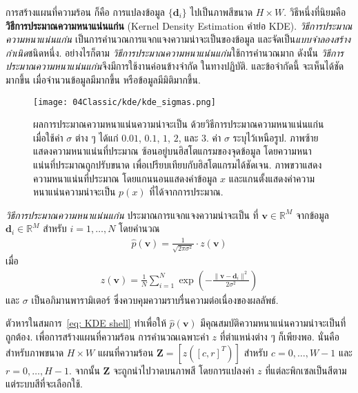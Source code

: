 การสร้างแผนที่ความร้อน ก็คือ
การแปลงข้อมูล $\{\bm{d}_i\}$ 
ไปเป็นภาพสีขนาด $H \times W$.
วิธีหนึ่งที่นิยมคือ \textbf{วิธีการประมาณความหนาแน่นแก่น} (Kernel Density Estimation คำย่อ KDE).
\textit{วิธีการประมาณความหนาแน่นแก่น}
เป็นการคำนวณการแจกแจงความน่าจะเป็นของข้อมูล
และจัดเป็น\textit{แบบจำลองสร้างกำเนิด}ชนิดหนึ่ง.
อย่างไรก็ตาม \textit{วิธีการประมาณความหนาแน่นแก่น}ใช้การคำนวณมาก
ดังนั้น \textit{วิธีการประมาณความหนาแน่นแก่น}จึงมีการใช้งานค่อนข้างจำกัด ในทางปฏิบัติ.
และข้อจำกัดนี้ จะเห็นได้ชัดมากขึ้น เมื่อจำนวนข้อมูลมีมากขึ้น หรือข้อมูลมีมิติมากขึ้น.

\begin{figure}
	\begin{center}
		\texttt{[image: 04Classic/kde/kde\_sigmas.png]}
	\end{center}
	\caption[วิธีการประมาณความหนาแน่นแก่น]{ผลการประมาณความหนาแน่นความน่าจะเป็น ด้วยวิธีการประมาณความหนาแน่นแก่น เมื่อใช้ค่า $\sigma$ ต่าง ๆ ได้แก่ $0.01$, $0.1$, $1$, $2$, และ $3$.
		ค่า $\sigma$ ระบุไว้เหนือรูป.
		ภาพซ้ายแสดงความหนาแน่นที่ประมาณ ซ้อนอยู่บนฮิสโตแกรมของจุดข้อมูล โดยความหนาแน่นที่ประมาณถูกปรับขนาด เพื่อเปรียบเทียบกับฮิสโตแกรมได้ชัดเจน.
		ภาพขวาแสดงความหนาแน่นที่ประมาณ โดยแกนนอนแสดงค่าข้อมูล $x$ และแกนตั้งแสดงค่าความหนาแน่นความน่าจะเป็น $p(x)$ ที่ได้จากการประมาณ.
	}
	\label{fig: kde sigma's}
\end{figure}

\textit{วิธีการประมาณความหนาแน่นแก่น}
ประมาณการแจกแจงความน่าจะเป็น
ที่ $\bm{v} \in \mathbb{R}^M$
จากข้อมูล $\bm{d}_i \in \mathbb{R}^M$ สำหรับ $i = 1, \ldots, N$
โดยคำนวณ
\begin{eqnarray}
\hat{p}(\bm{v}) = \frac{1}{\sqrt{2\pi\sigma^2}} \cdot z(\bm{v})
\label{eq: KDE shell}
\end{eqnarray}
เมื่อ
\begin{eqnarray}
z(\bm{v}) = \frac{1}{N} \sum_{i=1}^N \exp \left( - \frac{\| \bm{v} - \bm{d}_i \|^2}{2 \sigma^2} \right)
\label{eq: KDE kernel}
\end{eqnarray}
และ $\sigma$ เป็นอภิมานพารามิเตอร์ ซึ่งควบคุมความราบรื่นความต่อเนื่องของผลลัพธ์.

ตัวหารในสมการ~\ref{eq: KDE shell}
ทำเพื่อให้ $\hat{p}(\bm{v})$ มีคุณสมบัติความหนาแน่นความน่าจะเป็นที่ถูกต้อง.
เพื่อการสร้างแผนที่ความร้อน 
การคำนวณเฉพาะค่า $z$ ที่ตำแหน่งต่าง ๆ ก็เพียงพอ.
นั่นคือ สำหรับภาพขนาด $H \times W$
แผนที่ความร้อน $\bm{Z} = [z([c, r]^T)]$ สำหรับ $c = 0, \ldots, W-1$
และ $r = 0, \ldots, H-1$.
จากนั้น $\bm{Z}$ จะถูกนำไปวาดบนภาพสี โดยการแปลงค่า $z$ ที่แต่ละพิกเซลเป็นสีตามแต่ระบบสีที่จะเลือกใช้.

